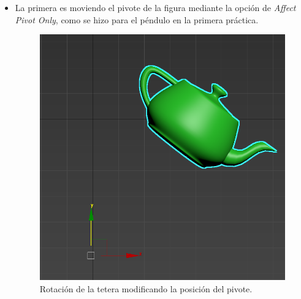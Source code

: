 \documentclass{article}
\begin{document}
\begin{itemize}
    \item La primera es moviendo el pivote de la figura mediante la opción de \textit{Affect Pivot Only}, como se hizo para el péndulo en la primera práctica.
    
    \begin{figure}[H]
        \centering
        \includegraphics[width=\textwidth]{imagenes/tetepivote.png}
        \caption{Rotación de la tetera modificando la posición del pivote.}
     \end{figure}    
    

\end{itemize}
\end{document}
